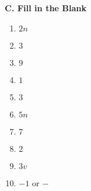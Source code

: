 {\begin{minipage}{\textwidth}
    \vspace*{1.3ex}
    
    \noindent \textbf{C. Fill in the Blank} \\
       
    \begin{enumerate}
    	\item $ 2n $
    	\item $ 3 $
    	\item $ 9 $
    	\item $ 1 $
    	\item $ 3 $
    	\item $ 5n$
    	\item $ 7 $
    	\item $ 2 $
    	\item $ 3v $
    	\item $ -1 $ or $ - $
    \end{enumerate}
    \end{minipage}}

